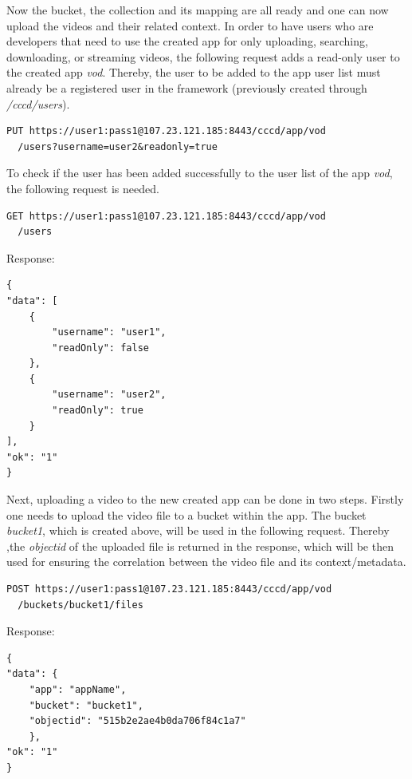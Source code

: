 Now the bucket, the collection and its mapping are all ready and one can now upload the videos and their related context. In order to have users who are developers that need to use the created app for only uploading, searching, downloading, or streaming videos, the following request adds a read-only user to the created app \textit{vod}. Thereby, the user to be added to the app user list must already be  a registered user in the framework (previously created through \textit{/cccd/users}).

\begin{code}
\begin{verbatim}
PUT https://user1:pass1@107.23.121.185:8443/cccd/app/vod
  /users?username=user2&readonly=true
\end{verbatim}
\end{code}

To check if the user has been added successfully to the user list of the app \textit{vod}, the following request is needed.

\begin{code}
\begin{verbatim}
GET https://user1:pass1@107.23.121.185:8443/cccd/app/vod
  /users
\end{verbatim}
Response:
\begin{verbatim}
{
"data": [
	{
		"username": "user1",
		"readOnly": false
	},
	{
		"username": "user2",
		"readOnly": true
	}
],
"ok": "1"
}
\end{verbatim}
\end{code}

Next, uploading a video to the new created app can be done in two steps. Firstly one needs to upload the video file to a bucket within the app. The bucket \textit{bucket1}, which is created above, will be used in the following request. Thereby ,the \textit{objectid} of the uploaded file is returned in the response, which will be then used for ensuring the correlation between the video file and its context/metadata.
\begin{code}
\begin{verbatim}
POST https://user1:pass1@107.23.121.185:8443/cccd/app/vod
  /buckets/bucket1/files
\end{verbatim}
Response:
\begin{verbatim}
{
"data": {
	"app": "appName",
	"bucket": "bucket1",
	"objectid": "515b2e2ae4b0da706f84c1a7"
	},
"ok": "1"
}
\end{verbatim}
\end{code}

